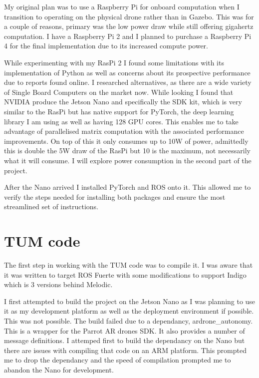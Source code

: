\documentclass[]{../resources/final_report}
\begin{document}
My original plan was to use a Raspberry Pi for onboard computation when I transition to 
operating on the physical drone rather than in Gazebo. This was for a couple of reasons, primary was 
the low power draw while still offering gigahertz computation. I have a Raspberry Pi 2 and I planned 
to purchase a Raspberry Pi 4 for the final implementation due to its increased compute power.

While experimenting with my RasPi 2 I found some limitations with its implementation of Python as 
well as concerns about its prospective performance due to reports found online. I researched 
alternatives, as there are a wide variety of Single Board Computers on the market now. While looking 
I found that NVIDIA produce the Jetson Nano and specifically the SDK kit, which is very similar to 
the RasPi but has native support for PyTorch, the deep learning library I am using as well as having 
128 GPU cores. This enables me to take advantage of parallelised matrix computation with the 
associated performance improvements. On top of this it only consumes up to 10W of power, admittedly 
this is double the 5W draw of the RasPi but 10 is the maximum, not necessarily what it will consume. 
I will explore power consumption in the second part of the project.

After the Nano arrived I installed PyTorch and ROS onto it. This allowed me to verify the steps 
needed for installing both packages and ensure the most streamlined set of instructions.


\section{TUM code}

The first step in working with the TUM code was to compile it. I was aware that it was written to 
target ROS Fuerte with some modifications to support Indigo which is 3 versions behind Melodic.

I first attempted to build the project on the Jetson Nano as I was planning to use it as my 
development platform as well as the deployment environment if possible. This was not possible. The 
build failed due to a dependancy, ardrone\_autonomy. This is a wrapper for the Parrot AR drones SDK. 
It also provides a number of message definitions. I attemped first to build the dependancy on the 
Nano but there are issues with compiling that code on an ARM platform. This prompted me to drop the 
dependancy and the speed of compilation prompted me to abandon the Nano for development.
\end{document}
